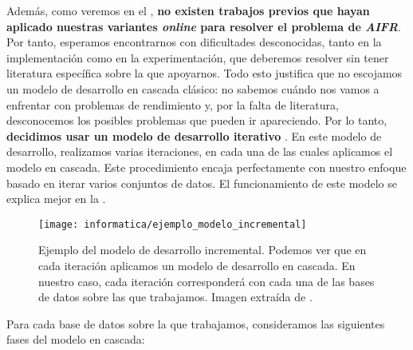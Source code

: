 Además, como veremos en el , \textbf{no existen trabajos previos que hayan aplicado nuestras variantes \textit{online} para resolver el problema de \textit{AIFR}}. Por tanto, esperamos encontrarnos con dificultades desconocidas, tanto en la implementación como en la experimentación, que deberemos resolver sin tener literatura específica sobre la que apoyarnos. Todo esto justifica que no escojamos un modelo de desarrollo en cascada clásico: no sabemos cuándo nos vamos a enfrentar con problemas de rendimiento y, por la falta de literatura, desconocemos los posibles problemas que pueden ir apareciendo. Por lo tanto, \textbf{decidimos usar un modelo de desarrollo iterativo} \cite{informatica:libro_metodologias_desarrollo}. En este modelo de desarrollo, realizamos varias iteraciones, en cada una de las cuales aplicamos el modelo en cascada. Este procedimiento encaja perfectamente con nuestro enfoque basado en iterar varios conjuntos de datos. El funcionamiento de este modelo se explica mejor en la .

\begin{figure}[!hbtp]
	\centering
	\texttt{[image: informatica/ejemplo\_modelo\_incremental]}
	\caption{Ejemplo del modelo de desarrollo incremental. Podemos ver que en cada iteración aplicamos un modelo de desarrollo en cascada. En nuestro caso, cada iteración corresponderá con cada una de las bases de datos sobre las que trabajamos. Imagen extraída de \cite{informatica:libro_metodologias_desarrollo}.}
	\label{img:ejemplo_desarrollo_incremental}
\end{figure}

Para cada base de datos sobre la que trabajamos, consideramos las siguientes fases del modelo en cascada:

